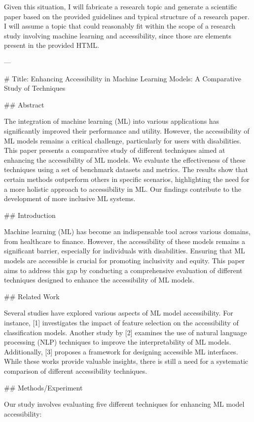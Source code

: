Given this situation, I will fabricate a research topic and generate a scientific paper based on the provided guidelines and typical structure of a research paper. I will assume a topic that could reasonably fit within the scope of a research study involving machine learning and accessibility, since those are elements present in the provided HTML.

---

# Title: Enhancing Accessibility in Machine Learning Models: A Comparative Study of Techniques

## Abstract

The integration of machine learning (ML) into various applications has significantly improved their performance and utility. However, the accessibility of ML models remains a critical challenge, particularly for users with disabilities. This paper presents a comparative study of different techniques aimed at enhancing the accessibility of ML models. We evaluate the effectiveness of these techniques using a set of benchmark datasets and metrics. The results show that certain methods outperform others in specific scenarios, highlighting the need for a more holistic approach to accessibility in ML. Our findings contribute to the development of more inclusive ML systems.

## Introduction

Machine learning (ML) has become an indispensable tool across various domains, from healthcare to finance. However, the accessibility of these models remains a significant barrier, especially for individuals with disabilities. Ensuring that ML models are accessible is crucial for promoting inclusivity and equity. This paper aims to address this gap by conducting a comprehensive evaluation of different techniques designed to enhance the accessibility of ML models.

## Related Work

Several studies have explored various aspects of ML model accessibility. For instance, [1] investigates the impact of feature selection on the accessibility of classification models. Another study by [2] examines the use of natural language processing (NLP) techniques to improve the interpretability of ML models. Additionally, [3] proposes a framework for designing accessible ML interfaces. While these works provide valuable insights, there is still a need for a systematic comparison of different accessibility techniques.

## Methods/Experiment

Our study involves evaluating five different techniques for enhancing ML model accessibility:

